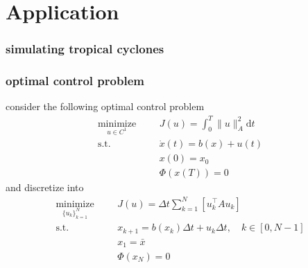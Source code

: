 \documentclass[10pt,dvipsnames*]{beamer}
\begin{document}
\section{Application}
\label{sec:application}
%
\begin{frame}
  \frametitle{simulating tropical cyclones \cite{plotkin_maximizing_2019}}
  \centering {}
\end{frame}
%
\begin{frame}
  \frametitle{optimal control problem}
  \pause consider the following optimal control problem
  \begin{subequations}
    \begin{align}
      \underset{u \in C^1}{\text{minimize}} && & J(u) = \int_0^T \|u\|_A^2 \mathrm{d}t \\
      \text{s.t.} && & \dot{x}(t) = b(x) + u(t) \\
                  && & x(0) = x_0 \\
                  && & \Phi(x(T)) = 0
    \end{align}
  \end{subequations}
  \pause and discretize into
  \begin{subequations}
    \begin{align}
      \underset{\{ u_k \}^N_{k = 1}}{\text{minimize}} && & J(u) = \Delta t \sum^{N}_{k = 1} \left [ u^{\top}_k A u_k \right ] \\
      \text{s.t.} && & x_{k + 1} = b(x_k) \Delta t + u_k \Delta t, \quad k \in [0, N-1]\\
                  && & x_1 = \bar{x} \\
                  && & \Phi(x_N) = 0
    \end{align}
  \end{subequations}
\end{frame}
\end{document}
